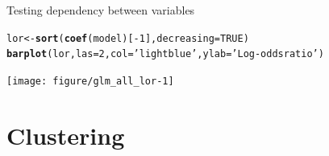 \documentclass{beamer}\usepackage[]{graphicx}\usepackage[]{color}
\makeatletter
\newcommand{\hlnum}[1]{\textcolor[rgb]{0.686,0.059,0.569}{#1}}%
\newcommand{\hlstr}[1]{\textcolor[rgb]{0.192,0.494,0.8}{#1}}%
\newcommand{\hlopt}[1]{\textcolor[rgb]{0,0,0}{#1}}%
\newcommand{\hlstd}[1]{\textcolor[rgb]{0.345,0.345,0.345}{#1}}%
\newcommand{\hlkwb}[1]{\textcolor[rgb]{0.69,0.353,0.396}{#1}}%
\newcommand{\hlkwc}[1]{\textcolor[rgb]{0.333,0.667,0.333}{#1}}%
\newcommand{\hlkwd}[1]{\textcolor[rgb]{0.737,0.353,0.396}{\textbf{#1}}}%
\newenvironment{kframe}{%
 \def\at@end@of@kframe{}%
 \ifinner\ifhmode%
  \def\at@end@of@kframe{\end{minipage}}%
  \begin{minipage}{\columnwidth}%
 \fi\fi%
 \def\FrameCommand##1{\hskip\@totalleftmargin \hskip-\fboxsep
 \colorbox{shadecolor}{##1}\hskip-\fboxsep
     \hskip-\linewidth \hskip-\@totalleftmargin \hskip\columnwidth}%
 \MakeFramed {\advance\hsize-\width
   \@totalleftmargin\z@ \linewidth\hsize
   \@setminipage}}%
 {\par\unskip\endMakeFramed%
 \at@end@of@kframe}
\newenvironment{knitrout}{}{} %
\makeatother
\begin{document}
\begin{frame}[fragile]{Testing dependency between variables}
\begin{knitrout}\tiny
{}\color{fgcolor}\begin{kframe}
\begin{alltt}
\hlstd{lor} \hlkwb{<-} \hlkwd{sort}\hlstd{(}\hlkwd{coef}\hlstd{(model)[}\hlopt{-}\hlnum{1}\hlstd{],} \hlkwc{decreasing}\hlstd{=}\hlnum{TRUE}\hlstd{)}
\hlkwd{barplot}\hlstd{(lor,} \hlkwc{las}\hlstd{=}\hlnum{2}\hlstd{,} \hlkwc{col}\hlstd{=}\hlstr{'lightblue'}\hlstd{,} \hlkwc{ylab}\hlstd{=}\hlstr{'Log-odds ratio'}\hlstd{)}
\end{alltt}
\end{kframe}

{\centering \texttt{[image: figure/glm\_all\_lor-1]} 

}



\end{knitrout}
\end{frame}


\section{Clustering}
\begin{frame}
\tableofcontents[currentsection]
\end{frame}
\end{document}
